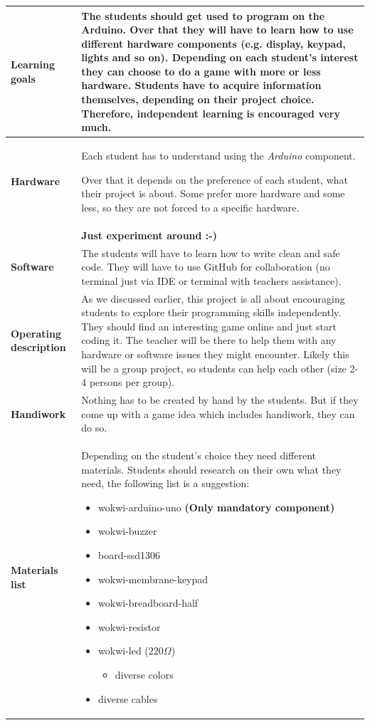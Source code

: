 \documentclass[10pt]{article}
\begin{document}
\begin{longtable}{|p{3.5cm}|p{11cm}|}
  \textbf{Learning goals} & The students should get used to program on the Arduino. Over that they will have to learn how to use different hardware components (e.g. display, keypad, lights and so on). Depending on each student's interest they can choose to do a game with more or less hardware. Students have to acquire information themselves, depending on their project choice. Therefore, independent learning is encouraged very much. \\ \hline
  
  \textbf{Hardware} & 
  Each student has to understand using the \textit{Arduino} component. 

  Over that it depends on the preference of each student, what their project is about. Some prefer more hardware and some less, so they are not forced to a specific hardware. \\ & \textbf{Just experiment around :-)}
  \\ \hline
  
  \textbf{Software} & The students will have to learn how to write clean and safe code. They will have to use GitHub for collaboration (no terminal just via IDE or terminal with teachers assistance).  \\ \hline
  
  \textbf{Operating description} & As we discussed earlier, this project is all about encouraging students to explore their programming skills independently. They should find an interesting game online and just start coding it. The teacher will be there to help them with any hardware or software issues they might encounter. Likely this will be a group project, so students can help each other (size 2-4 persons per group).
  \\ \hline
  
  \textbf{Handiwork} & Nothing has to be created by hand by the students. But if they come up with a game idea which includes handiwork, they can do so. \\ \hline
  
  \textbf{Materials list} & 
  Depending on the student's choice they need different materials. Students should research on their own what they need, the following list is a suggestion:
  \begin{itemize}
    \item wokwi-arduino-uno \textbf{(Only mandatory component)}
    \item wokwi-buzzer
    \item board-ssd1306
    \item wokwi-membrane-keypad
    \item wokwi-breadboard-half
    \item wokwi-resistor
    \item wokwi-led ($220 \Omega$)
    \begin{itemize}
      \item diverse colors
    \end{itemize}
    \item diverse cables
  \end{itemize}
  \\ \hline
  

\end{longtable}
\end{document}
